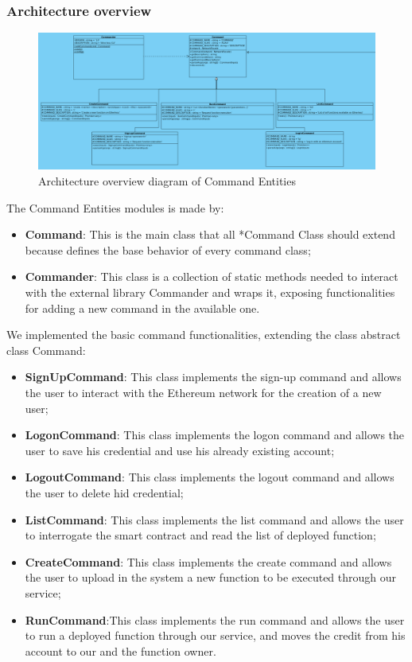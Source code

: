 \subsubsection{Architecture overview}
\begin{figure}[h]
	\centering
	\includegraphics[width=\textwidth]{./res/img/CommandEntities.png}
	\caption{Architecture overview diagram of Command Entities}
\end{figure}
The Command Entities modules is made by:
\begin{itemize}
    \item \textbf{Command}: This is the main class that all *Command Class should extend because defines the base behavior of every command class;
    \item \textbf{Commander}: This class is a collection of static methods needed to interact with the external library Commander and wraps it, exposing functionalities for adding a new command in the available one.
\end{itemize}
We implemented the basic command functionalities, extending the class abstract class Command:
\begin{itemize}
    \item \textbf{SignUpCommand}: This class implements the sign-up command and allows the user to interact with the Ethereum network for the creation of a new user;
    \item \textbf{LogonCommand}: This class implements the logon command and allows the user to save his credential and use his already existing account;
    \item \textbf{LogoutCommand}: This class implements the logout command and allows the user to delete hid credential;
    \item \textbf{ListCommand}: This class implements the list command and allows the user to interrogate the smart contract and read the list of deployed function;
    \item \textbf{CreateCommand}: This class implements the create command and allows the user to upload in the system a new function to be executed through our service;
    \item \textbf{RunCommand}:This class implements the run command and allows the user to run a deployed function through our service, and moves the credit from his account to our and the function owner.
\end{itemize}
